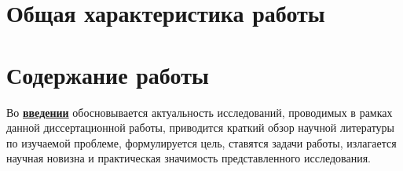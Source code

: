 \newcommand{\ifext}[2]{\ifdefined\extflag{#1}\else{#2}\fi}
\newcommand{\tick}{\checkmark}%
\newcommand{\tickP}{\checkmark}%
\newcommand{\tickPP}{\checkmark}%
\newcommand{\xmark}{\text{\ding{55}}}
\newcommand{\fail}{\xmark}%
\newcommand\Cf{\mathit{Prog}}%

\section*{Общая характеристика работы}

\newcommand{\actuality}{\underline{\textbf{\actualityTXT}}}
\newcommand{\progress}{\underline{\textbf{\progressTXT}}}
\newcommand{\aim}{\underline{{\textbf\aimTXT}}}
\newcommand{\tasks}{\underline{\textbf{\tasksTXT}}}
\newcommand{\novelty}{\underline{\textbf{\noveltyTXT}}}
\newcommand{\influence}{\underline{\textbf{\influenceTXT}}}
\newcommand{\methods}{\underline{\textbf{\methodsTXT}}}
\newcommand{\defpositions}{\underline{\textbf{\defpositionsTXT}}}
\newcommand{\reliability}{\underline{\textbf{\reliabilityTXT}}}
\newcommand{\probation}{\underline{\textbf{\probationTXT}}}
\newcommand{\contribution}{\underline{\textbf{\contributionTXT}}}
\newcommand{\publications}{\underline{\textbf{\publicationsTXT}}}




\section*{Содержание работы}
Во \underline{\textbf{введении}} обосновывается актуальность
исследований, проводимых в рамках данной диссертационной работы,
приводится краткий обзор научной литературы по изучаемой проблеме,
формулируется цель, ставятся задачи работы, излагается научная новизна
и практическая значимость представленного исследования.

